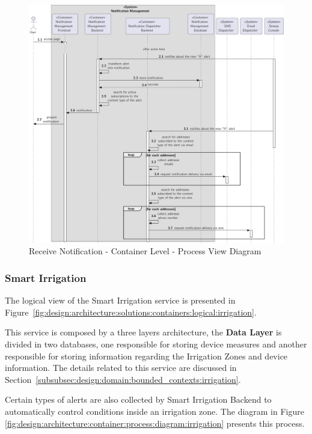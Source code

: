 \begin{figure}[H]
   \centering
   \includegraphics[page=1,width=\columnwidth]{assets/diagrams/design/architectural/level2/process/notification-dispatch.pdf}
   \caption[Receive Notification - Container Level - Process View Diagram]{Receive Notification - Container Level - Process View Diagram}
   \label{fig:design:architecture:container:process:diagram:notification}
\end{figure}

\subsubsection{Smart Irrigation}
\label{subsubsec:design:architecture:solutions:irrigation}

The logical view of the Smart Irrigation service is presented in Figure~\ref{fig:design:architecture:solutions:containers:logical:irrigation}.

This service is composed by a three layers architecture, the \textbf{Data Layer} is divided in two databases, one responsible for storing device measures and another responsible for storing information regarding the Irrigation Zones and device information. The details related to this service are discussed in Section~\ref{subsubsec:design:domain:bounded_contexts:irrigation}.

Certain types of alerts are also collected by Smart Irrigation Backend to automatically control conditions inside an irrigation zone. The diagram in Figure \ref{fig:design:architecture:container:process:diagram:irrigation} presents this process.

